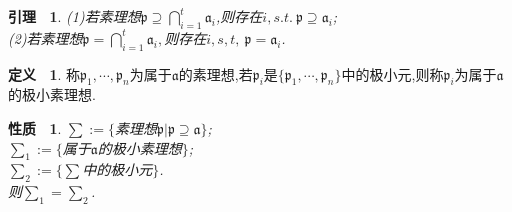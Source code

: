 \documentclass[b5paper,oneside]{ctexbook}
\newcommand{\mf}[1]{\mathfrak{#1}}
\theoremstyle{plain}
\newtheorem{lem}[thm]{引理~}
\newtheorem{prop}[thm]{性质~}
\theoremstyle{definition}
\newtheorem{defn}[thm]{定义~}
\begin{document}
\begin{lem}(1)若素理想$\mf{p}\supseteq \bigcap_{i=1}^t\mf{a}_i$,则存在$i,s.t.~\mf{p}\supseteq\mf{a}_i$;\\
(2)若素理想$\mf{p}=\bigcap_{i=1}^t\mf{a}_i,$则存在$i,s,t,~\mf{p}=\mf{a}_i$.
\end{lem}
\begin{defn}称$\mf{p}_1,\cdots,\mf{p}_n$为属于$\mf{a}$的素理想,若$\mf{p}_i$是$\{\mf{p}_1,\cdots,\mf{p}_n\}$中的极小元,则称$\mf{p}_i$为属于$\mf{a}$的极小素理想.
\end{defn}
\begin{prop}
$\sum:=\{$素理想$\mf{p}|\mf{p}\supseteq \mf{a}\}$;\\
$\sum_1:=\{$属于$\mf{a}$的极小素理想$\}$;\\
$\sum_2:=\{\sum$中的极小元$\}$.\\
则$\sum_1=\sum_2$.
\end{prop}
\end{document}
